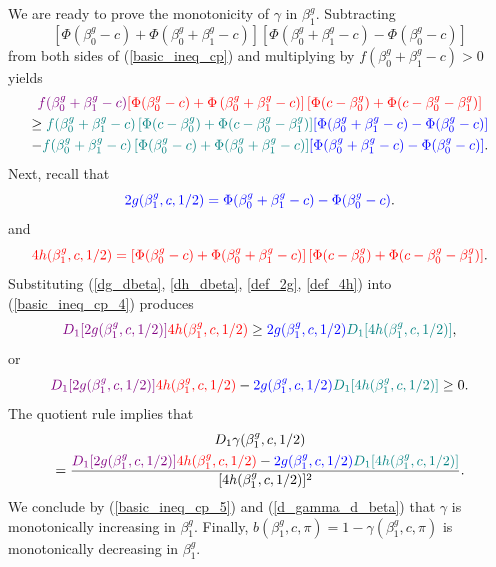 \documentclass[12pt]{article}
\begin{document}
We are ready to prove the monotonicity of $\gamma$ in $\beta^g_1$. Subtracting $$\left[\Phi(\beta_0^g - c) + \Phi(\beta^g_0 + \beta^g_1 - c) \right]\left[\Phi(\beta_0^g + \beta_1^g - c) - \Phi(\beta_0^g - c)\right]$$ from both sides of (\ref{basic_ineq_cp}) and multiplying by $f(\beta^g_0 + \beta^g_1 - c) > 0$ yields
\begin{multline}\label{basic_ineq_cp_4}
\textcolor{violet}{f(\beta^g_0 + \beta^g_1 - c)} \textcolor{red}{ \left[\Phi(\beta^g_0 - c) + \Phi\left(\beta^g_0 + \beta^g_1 - c \right) \right] \left[ \Phi(c - \beta^g_0) + \Phi(c - \beta^g_0 - \beta^g_1) \right]}  \\ \geq \textcolor{teal}{f(\beta^g_0 + \beta^g_1 - c) \left[\Phi(c - \beta^g_0) + \Phi(c - \beta_0^g - \beta_1^g)\right]}\textcolor{blue}{\left[\Phi(\beta_0^g + \beta_1^g - c) - \Phi(\beta_0^g - c)\right]} \\ -\textcolor{teal}{f(\beta^g_0 + \beta^g_1 - c)   \left[\Phi(\beta_0^g - c) + \Phi(\beta^g_0 + \beta^g_1 - c) \right]} \textcolor{blue}{\left[\Phi(\beta_0^g + \beta_1^g - c) - \Phi(\beta_0^g - c)\right]}.
\end{multline}
Next, recall that
\begin{equation}\label{def_2g}
\textcolor{blue}{2g(\beta^g_1,c,1/2) = \Phi(\beta^g_0 + \beta^g_1 - c) - \Phi(\beta^g_0 - c)}.
\end{equation}
and
\begin{equation}\label{def_4h}
\textcolor{red}{4h(\beta^g_1, c, 1/2) = \left[ \Phi(\beta^g_0 - c) + \Phi(\beta^g_0 + \beta^g_1 - c) \right] \left[\Phi(c - \beta^g_0) + \Phi( c - \beta^g_0 - \beta^g_1) \right]}.
\end{equation}
Substituting (\ref{dg_dbeta}, \ref{dh_dbeta}, \ref{def_2g}, \ref{def_4h}) into (\ref{basic_ineq_cp_4}) produces
\begin{equation*}
\textcolor{violet}{D_1[2g(\beta^g_1, c, 1/2)]}\textcolor{red}{4h(\beta^g_1, c, 1/2)} \geq \textcolor{blue}{2g(\beta^g_1, c, 1/2)}\textcolor{teal}{D_1[4h(\beta^g_1, c, 1/2)]},
\end{equation*}
or 
\begin{equation}\label{basic_ineq_cp_5}
\textcolor{violet}{D_1[2g(\beta^g_1, c, 1/2)]}\textcolor{red}{4h(\beta^g_1, c, 1/2)} - \textcolor{blue}{2g(\beta^g_1, c, 1/2)}\textcolor{teal}{D_1[4h(\beta^g_1, c, 1/2)]} \geq 0.
\end{equation}
The quotient rule implies that
\begin{multline}\label{d_gamma_d_beta}
D_1 \gamma(\beta^g_1, c, 1/2) \\ = \frac{ \textcolor{violet}{D_1[2g(\beta^g_1, c, 1/2)]}\textcolor{red}{4h(\beta^g_1, c, 1/2)} - \textcolor{blue}{2g(\beta^g_1, c, 1/2)}\textcolor{teal}{D_1[4h(\beta^g_1, c, 1/2)]} }{[4h(\beta^g_1, c, 1/2)]^2}.
\end{multline}
We conclude by (\ref{basic_ineq_cp_5}) and (\ref{d_gamma_d_beta}) that $\gamma$ is monotonically increasing in $\beta^g_1$. Finally, $b(\beta^g_1, c, \pi) = 1 - \gamma(\beta^g_1, c, \pi)$ is monotonically decreasing in $\beta^g_1$.
\end{document}
